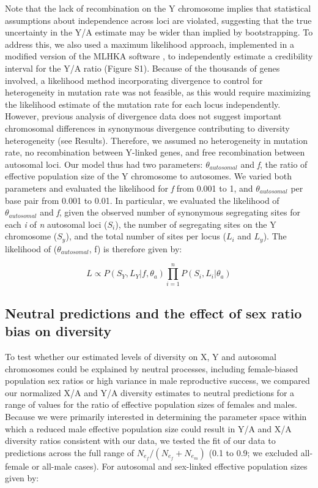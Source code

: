\documentclass[9pt,twocolumn,twoside]{gsajnl}
\begin{document}
Note that the lack of recombination on the Y chromosome implies that statistical assumptions about independence across loci are violated, suggesting that the true uncertainty in the Y/A estimate may be wider than implied by bootstrapping. To address this, we also used a maximum likelihood approach, implemented in a modified version of the MLHKA software \citep{wright2004hka}, to independently estimate a credibility interval for the Y/A ratio (Figure S1). Because of the thousands of genes involved, a likelihood method incorporating divergence to control for heterogeneity in mutation rate was not feasible, as this would require maximizing the likelihood estimate of the mutation rate for each locus independently. However, previous analysis of divergence data does not suggest important chromosomal differences in synonymous divergence contributing to diversity heterogeneity (see Results). Therefore, we assumed no heterogeneity in mutation rate, no recombination between Y-linked genes, and free recombination between autosomal loci. Our model thus had two parameters: $\theta_{autosomal}$ and \textit{f}, the ratio of effective population size of the Y chromosome to autosomes. We varied both parameters and evaluated the likelihood for \textit{f} from 0.001 to 1, and $\theta_{autosomal}$ per base pair from 0.001 to 0.01. In particular, we evaluated the likelihood of $\theta_{autosomal}$ and \textit{f}, given the observed number of synonymous segregating sites for each \textit{i} of \textit{n} autosomal loci ($S_{i}$), the number of segregating sites on the Y chromosome ($S_{y}$), and the total number of sites per locus ($L_{i}$ and $L_{y}$). The likelihood of ($\theta_{autosomal}$, f) is therefore given by:

\begin{equation}
L \propto  P(S_{Y}, L_{Y} | f, \theta_{a})\prod_{i=1}^{n}P(S_{i}, L_{i} | \theta_{a})  \label{eq:L}
\end{equation}

\subsection*{Neutral predictions and the effect of sex ratio bias on diversity}
To test whether our estimated levels of diversity on X, Y and autosomal chromosomes could be explained by neutral processes, including female-biased population sex ratios or high variance in male reproductive success, we compared our normalized X/A and Y/A diversity estimates to neutral predictions for a range of values for the ratio of effective population sizes of females and males. Because we were primarily interested in determining the parameter space within which a reduced male effective population size could result in Y/A and X/A diversity ratios consistent with our data, we tested the fit of our data to predictions across the full range of $N_{e}_{f}/(N_{e}_{f} + N_{e}_{m})$ (0.1 to 0.9; we excluded all-female or all-male cases). For autosomal and sex-linked effective population sizes given by:
\end{document}
